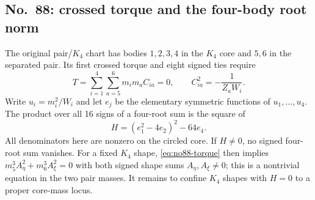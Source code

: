\documentclass[11pt]{amsart}
\theoremstyle{remark}
\begin{document}
\subsection{No.~88: crossed torque and the four-body root norm}
The original pair/$K_4$ chart has bodies $1,2,3,4$ in the $K_4$ core and $5,6$ in the separated pair. Its first crossed torque and eight signed ties require
\begin{equation}\label{eq:no88-torque}
T=\sum_{i=1}^4\sum_{a=5}^6m_im_aC_{ia}=0,
\qquad C_{ia}^2=-\frac1{Z_aW_i}.
\end{equation}
Write $u_i=m_i^2/W_i$ and let $e_j$ be the elementary symmetric functions of $u_1,\ldots,u_4$. The product over all 16 signs of a four-root sum is the square of
\begin{equation}\label{eq:no88-root-norm}
H=(e_1^2-4e_2)^2-64e_4.
\end{equation}
All denominators here are nonzero on the circled core. If $H\ne0$, no signed four-root sum vanishes. For a fixed $K_4$ shape, \eqref{eq:no88-torque} then implies $m_5^3A_\eta^2+m_6^3A_\xi^2=0$ with both signed shape sums $A_\eta,A_\xi\ne0$; this is a nontrivial equation in the two pair masses. It remains to confine $K_4$ shapes with $H=0$ to a proper core-mass locus.
\end{document}
